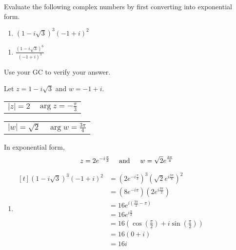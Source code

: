 \documentclass[11pt,a4paper]{book}
\begin{document}
\begin{example}

Evaluate the following complex numbers by first converting into exponential
form.

\begin{minipage}[t]{0.5\textwidth}

\begin{enumerate}[label=(\alph*)]

\item  $\left(1-i\sqrt{3}\right)^{3}\left(-1+i\right)^{2}$

\end{enumerate}

\end{minipage}
\begin{minipage}[t]{0.5\textwidth}

\begin{enumerate}[label=(\alph*),start=2]

\item  ${\displaystyle \frac{\left(1-i\sqrt{3}\right)^{6}}{\left(-1+i\right)^{3}}}$

\end{enumerate}

\end{minipage}

Use your GC to verify your answer.

\Solution

Let $z=1-i\sqrt{3}$ and $w=-1+i$.

\begin{tabular}{>{\raggedright}p{3cm}>{\raggedright}p{3cm}}
$\left|z\right|=2$ & ${\displaystyle \arg z=-\frac{\pi}{3}}$\tabularnewline
\end{tabular}

\begin{tabular}{>{\raggedright}p{3cm}>{\raggedright}p{3cm}}
$\left|w\right|=\sqrt{2}$ & ${\displaystyle \arg w=\frac{3\pi}{4}}$\tabularnewline
\end{tabular}

In exponential form,
\[
z=2e^{-i\frac{\pi}{3}}\quad\text{ and \,}\quad w=\sqrt{2}e^{\frac{3\pi}{4}}
\]

\begin{enumerate}[label=(\alph*)]

\item
$
\!
\begin{aligned}[t]
\left(1-i\sqrt{3}\right)^{3}\left(-1+i\right)^{2} & =\left(2e^{-i\frac{\pi}{3}}\right)^{3}\left(\sqrt{2}e^{i\frac{3\pi}{4}}\right)^{2}\\
 & =\left(8e^{-i\pi}\right)\left(2e^{i\frac{3\pi}{2}}\right)\\
 & =16e^{i\left(\frac{3\pi}{2}-\pi\right)}\\
 & =16e^{i\frac{\pi}{2}}\\
 & =16\left(\cos\left(\frac{\pi}{2}\right)+i\sin\left(\frac{\pi}{2}\right)\right)\\
 & =16\left(0+i\right)\\
 & =16i
\end{aligned}
$


\end{enumerate}
\end{example}
\end{document}

